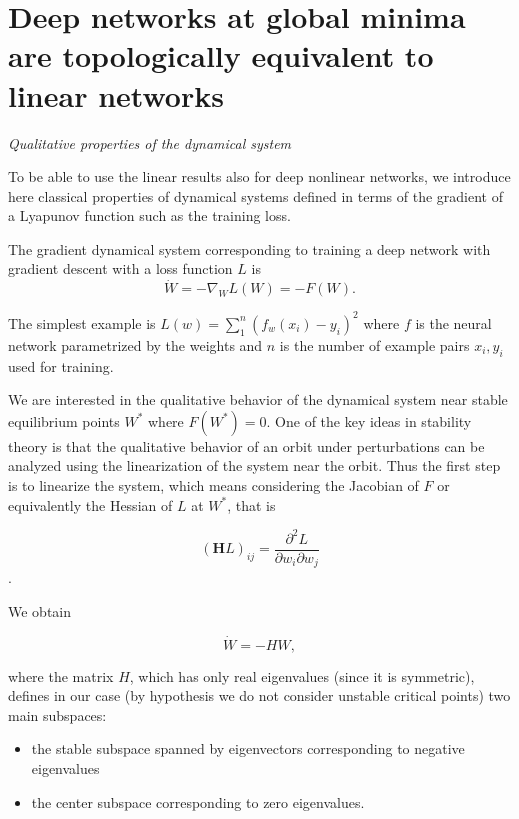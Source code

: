 \documentclass[10pt]{article}
\begin{document}
\section{Deep networks at global minima are topologically equivalent to linear networks} 

{\it Qualitative properties of the dynamical system}

To be able to use the linear results also for deep nonlinear networks,
we introduce here classical properties of dynamical systems defined in
terms of the gradient of a Lyapunov function such as the training
loss. 


The gradient dynamical system corresponding to training a deep network
with gradient descent with a loss function $L$ is
\begin{equation}
\dot{W} = -\nabla_{W} L(W) = - F(W).
\label{GradSys}
\end{equation}

The simplest example is $L(w)=\sum_1^n (f_w(x_i)-y_i)^2$ where $f$ is
the neural network parametrized by the weights and $n$ is the number
of example pairs $x_i, y_i$ used for training. 

We are interested in the qualitative behavior of the dynamical system
near stable equilibrium points $W^*$ where $F(W^*)=0$. One of the key
ideas in stability theory is that the qualitative behavior of an orbit
under perturbations can be analyzed using the linearization of the
system near the orbit.  Thus the first step is to linearize the
system, which means considering the Jacobian of $F$ or equivalently
the Hessian of $L$ at $W^*$, that is

 \begin{equation}
  (\mathbf{H} L)_{ij} = \frac{\partial^{2} L}{\partial
                      w_{i} \partial w_{j} }
 \end{equation}. 

We obtain

\begin{equation}
\dot{W} = - H W,
\label{GradSysLin}
\end{equation}

\noindent where the matrix $H$, which has only real
eigenvalues (since it is symmetric), defines in our case (by
hypothesis we do not consider unstable critical points) two main subspaces:

\begin{itemize}
\item the stable subspace spanned by eigenvectors corresponding to
  negative eigenvalues
\item the center subspace corresponding to zero eigenvalues.
\end{itemize}
\end{document}
